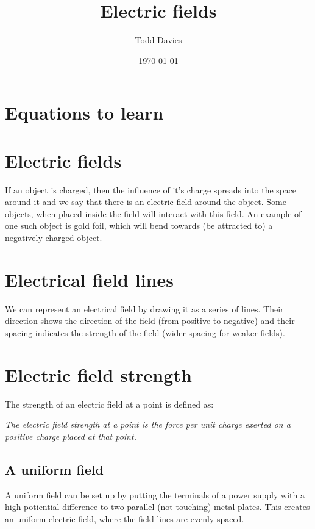 \documentclass{article}
\title{Electric fields}
\author{Todd Davies}
\date{\today}
\begin{document}
\lhead{\today}

\maketitle

\section*{Equations to learn}
\thispagestyle{empty}


\section*{Electric fields}

If an object is charged, then the influence of it's charge spreads into the
space around it and we say that there is an electric field around the object.
Some objects, when placed inside the field will interact with this field. An
example of one such object is gold foil, which will bend towards (be attracted
to) a negatively charged object.

\section*{Electrical field lines}

We can represent an electrical field by drawing it as a series of lines. Their direction shows the direction of the field (from positive to negative) and their spacing indicates the strength of the field (wider spacing for weaker fields). 

\section*{Electric field strength}

The strength of an electric field at a point is defined as:

{\it The electric field strength at a point is the force per unit charge exerted
on a positive charge placed at that point.}

\subsection*{A uniform field}

A uniform field can be set up by putting the terminals of a power supply with a
high potiential difference to two parallel (not touching) metal plates. This
creates an uniform electric field, where the field lines are evenly spaced.
\end{document}
